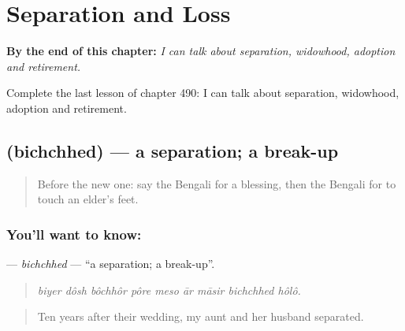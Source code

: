 
\chapter{Separation and Loss}
\label{ch:bn-separation-and-loss}

\begin{chapteropening}
\textbf{By the end of this chapter:} \emph{I can talk about separation, widowhood, adoption and retirement.}

Complete the last lesson of chapter 490: I can talk about separation, widowhood, adoption and retirement.
\end{chapteropening}

\section[\texorpdfstring{\bn{বিচ্ছেদ} (bichchhed)}{বিচ্ছেদ (bichchhed)}]{ (bichchhed) — a separation; a break-up}

\label{lesson:BN-C490-bichchhed}



\begin{quote}
Before the new one: say the Bengali for a blessing, then the Bengali for to touch an elder's feet.
\end{quote}

\subsection*{You'll want to know: }
\textbf{} — \emph{bichchhed} — \textquotedblleft{}a separation; a break-up\textquotedblright{}.

\begin{quote}
        
\end{quote}

\begin{quote}
\emph{biyer dôsh bôchhôr pôre meso ār māsir bichchhed hôlô.}
\end{quote}

\begin{quote}
Ten years after their wedding, my aunt and her husband separated.
\end{quote}

